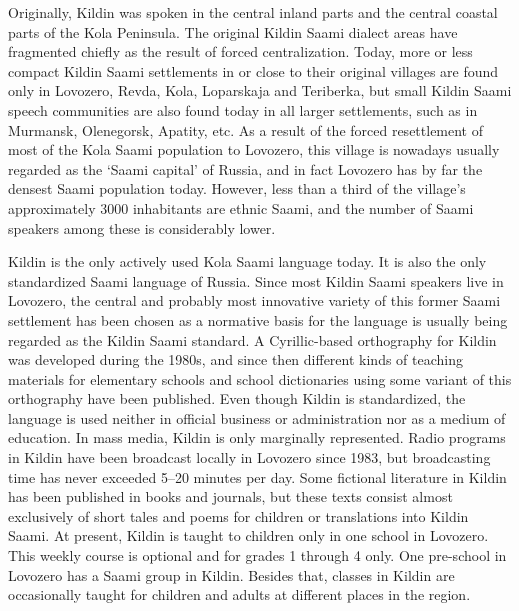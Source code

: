 \documentclass[a4paper,12pt]{article}
\begin{document}
Originally, Kildin was spoken in the central inland parts and the central coastal parts of the Kola Peninsula. The original Kildin Saami dialect areas have fragmented chiefly as the result of forced centralization. Today, more or less compact Kildin Saami settlements in or close to their original villages are found only in Lovozero, Revda, Kola, Loparskaja and Teriberka, but small Kildin Saami speech communities are also found today in all larger settlements, such as in Murmansk, Olenegorsk, Apatity, etc. As a result of the forced resettlement of most of the Kola Saami population to Lovozero, this village is nowadays usually regarded as the ‘Saami capital’ of Russia, and in fact Lovozero has by far the densest Saami population today. However, less than a third of the village’s approximately 3000 inhabitants are ethnic Saami, and the number of Saami speakers among these is considerably lower.

Kildin is the only actively used Kola Saami language today. It is also the only standardized Saami language of Russia. Since most Kildin Saami speakers live in Lovozero, the central and probably most innovative variety of this former Saami settlement has been chosen as a normative basis for the language is usually being regarded as the Kildin Saami standard. A Cyrillic-based orthography for Kildin was developed during the 1980s, and since then different kinds of teaching materials for elementary schools and school dictionaries using some variant of this orthography have been published. Even though Kildin is standardized, the language is used neither in official business or administration nor as a medium of education. In mass media, Kildin is only marginally represented. Radio programs in Kildin have been broadcast locally  in Lovozero since 1983, but broadcasting time has never exceeded 5–20 minutes per day. Some fictional literature in Kildin has been published in books and journals, but these texts consist almost exclusively of short tales and poems for children or translations into Kildin Saami. At present, Kildin is taught to children only in one school in Lovozero. This weekly course is optional and for grades 1 through 4 only. One pre-school in Lovozero has a Saami group in Kildin. Besides that, classes in Kildin are occasionally taught for children and adults at different places in the region.
\end{document}
